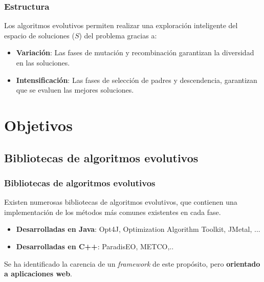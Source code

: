 \documentclass{beamer}
\begin{document}
\begin{frame}
\frametitle{Estructura}

Los algoritmos evolutivos permiten realizar una exploración inteligente del espacio de soluciones ($S$) del problema gracias a:

\bigskip

\begin{itemize}
    \item \textbf{Variación}: Las fases de mutación y recombinación garantizan la diversidad en las soluciones.
    \item \textbf{Intensificación}: Las fases de selección de padres y descendencia, garantizan que se evaluen las mejores soluciones.
\end{itemize}

\end{frame}

\section{Objetivos}


\subsection{Bibliotecas de algoritmos evolutivos}

\begin{frame}
\frametitle{Bibliotecas de algoritmos evolutivos}

Existen numerosas bibliotecas de algoritmos evolutivos, que contienen una implementación de los métodos más comunes existentes en cada fase. \\

\bigskip

\begin{itemize}
    \item \textbf{Desarrolladas en Java}: Opt4J, Optimization Algorithm Toolkit, JMetal, ...
    \item \textbf{Desarrolladas en C++}: ParadisEO, METCO,..
\end{itemize}

\bigskip

Se ha identificado la carencia de un \textit{framework} de este propósito, pero \textbf{orientado a aplicaciones web}.

\end{frame}
\end{document}
